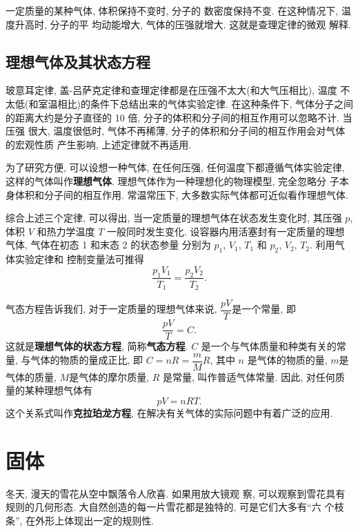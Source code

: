 \documentclass[11pt,a4paper]{ctexbook}
\begin{document}
一定质量的某种气体, 体积保持不变时, 分子的
数密度保持不变. 在这种情况下, 温度升高时, 分子的平
均动能增大, 气体的压强就增大. 这就是查理定律的微观
解释.

\subsection{理想气体及其状态方程}

玻意耳定律, 盖-吕萨克定律和查理定律都是在压强不太大(和大气压相比), 温度
不太低(和室温相比)的条件下总结出来的气体实验定律. 在这种条件下, 气体分子之间
的距离大约是分子直径的 10 倍, 分子的体积和分子间的相互作用可以忽略不计. 当压强
很大, 温度很低时, 气体不再稀薄, 分子的体积和分子间的相互作用会对气体的宏观性质
产生影响, 上述定律就不再适用.

为了研究方便, 可以设想一种气体, 在任何压强, 任何温度下都遵循气体实验定律,
这样的气体叫作\textbf{理想气体}. 理想气体作为一种理想化的物理模型, 完全忽略分
子本身体积和分子间的相互作用. 常温常压下, 大多数实际气体都可近似看作理想气体.


综合上述三个定律, 可以得出, 当一定质量的理想气体在状态发生变化时,
其压强 $p$, 体积 $V$ 和热力学温度 $T$ 一般同时发生变化.
设容器内用活塞封有一定质量的理想气体, 气体在初态 1 和末态 2 的状态参量
分别为 $p_1$, $V_1$, $T_1$ 和 $p_2$, $V_2$, $T_2$. 利用气体实验定律和
控制变量法可推得$$\frac{p_1V_1}{T_1} = \frac{p_2V_2}{T_2}.$$

气态方程告诉我们, 对于一定质量的理想气体来说, $\dfrac{pV}{T}$是一个常量,
即
\begin{equation}
    \frac{pV}{T} = C.
    \label{理想气体状态方程}
\end{equation}
这就是\textbf{理想气体的状态方程}, 简称\textbf{气态方程}. $C$ 是一个与气体质量和种类有关的常量,
与气体的物质的量成正比, 即 $C = nR = \dfrac{m}{M}R$, 其中 $n$ 是气体的物质的量,
$m$是气体的质量, $M$是气体的摩尔质量, $R$ 是常量, 叫作普适气体常量.
因此, 对任何质量的某种理想气体有
\begin{equation}
    pV = nRT.
    \label{克拉珀龙方程}
\end{equation}
这个关系式叫作\textbf{克拉珀龙方程}, 在解决有关气体的实际问题中有着广泛的应用.

\section{固体}

冬天, 漫天的雪花从空中飘落令人欣喜. 如果用放大镜观
察, 可以观察到雪花具有规则的几何形态.
大自然创造的每一片雪花都是独特的, 可是它们大多有``六
个枝条'', 在外形上体现出一定的规则性.
\end{document}
